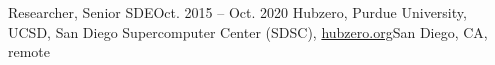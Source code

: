 \resumeSubheading
{Researcher, Senior SDE}{Oct. 2015 -- Oct. 2020}
{Hubzero, Purdue University, UCSD, San Diego Supercomputer Center (SDSC), \href{https://hubzero.org}{hubzero.org}}{San Diego, CA, remote}
\resumeItemListStart
\resumeItemListEnd